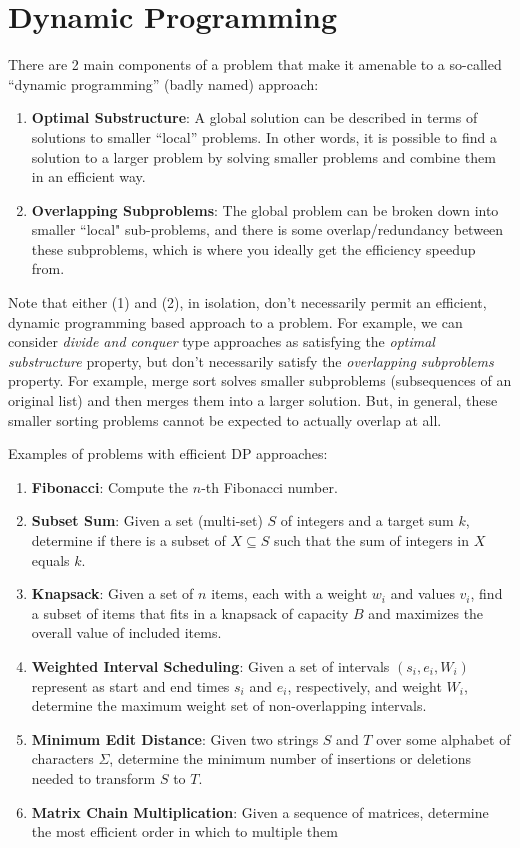 \documentclass[10pt,a4paper]{article}
\begin{document}
\section{Dynamic Programming}

There are 2 main components of a problem that make it amenable to a so-called ``dynamic programming'' (badly named) approach:
\begin{enumerate}
    \item \textbf{Optimal Substructure}: A global solution can be described in terms of solutions to smaller ``local'' problems. In other words, it is possible to find a solution to a larger problem by solving smaller problems and combine them in an efficient way. 
    \item \textbf{Overlapping Subproblems}: The global problem can be broken down into smaller ``local" sub-problems, and there is some overlap/redundancy between these subproblems, which is where you ideally get the efficiency speedup from.
\end{enumerate}
Note that either (1) and (2), in isolation, don't necessarily permit an efficient, dynamic programming based approach to a problem. For example, we can consider \textit{divide and conquer} type approaches as satisfying the \textit{optimal substructure} property, but don't necessarily satisfy the \textit{overlapping subproblems} property. For example, merge sort solves smaller subproblems (subsequences of an original list) and then merges them into a larger solution. But, in general, these smaller sorting problems cannot be expected to actually overlap at all.

Examples of problems with efficient DP approaches:
\begin{enumerate}
    \item \textbf{Fibonacci}: Compute the $n$-th Fibonacci number.
    \item \textbf{Subset Sum}: Given a set (multi-set) $S$ of integers and a target sum $k$, determine if there is a subset of $X \subseteq S$ such that the sum of integers in $X$ equals $k$.
    \item \textbf{Knapsack}: Given a set of $n$ items, each with a weight $w_i$ and values $v_i$, find a subset of items that fits in a knapsack of capacity $B$ and maximizes the overall value of included items.
    \item \textbf{Weighted Interval Scheduling}: Given a set of intervals $(s_i,e_i, W_i)$ represent as start and end times $s_i$ and $e_i$, respectively, and weight $W_i$, determine the maximum weight set of non-overlapping intervals.
    \item \textbf{Minimum Edit Distance}: Given two strings $S$ and $T$ over some alphabet of characters $\Sigma$, determine the minimum number of insertions or deletions needed to transform $S$ to $T$.
    \item \textbf{Matrix Chain Multiplication}: Given a sequence of matrices, determine the most efficient order in which to multiple them
\end{enumerate}
\end{document}
